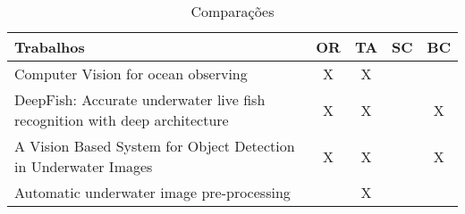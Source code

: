 \begin{table}[H]
\caption{Comparações}
\small
\centering
\begin{tabular}{|p{8cm}|c | c | c | c |}
 
	\hline \textbf{Trabalhos} & \textbf{OR} & \textbf{TA} & \textbf{SC} & \textbf{BC}\\ \hline
	
    Computer Vision for ocean observing & X & X &  &  \\ \hline
	
    DeepFish: Accurate underwater live fish recognition with deep architecture & \centering X & X &  & X \\ \hline
      
      A Vision Based System for Object Detection in Underwater Images & X & X & & X  \\ \hline  
      
        Automatic underwater image pre-processing &  & X & &   \\ \hline
	\end{tabular}

\end{table}


